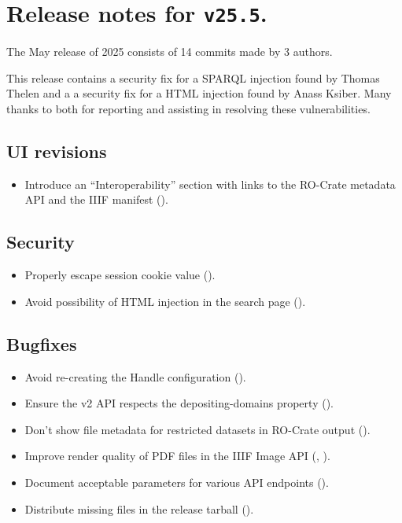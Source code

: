 \section*{Release notes for \texttt{v25.5}.}

  The May release of 2025 consists of 14 commits made by 3 authors.

  This release contains a security fix for a SPARQL injection found by Thomas
  Thelen and a a security fix for a HTML injection found by Anass Ksiber.  Many
  thanks to both for reporting and assisting in resolving these vulnerabilities.

\subsection*{UI revisions}
\begin{itemize}
\item{Introduce an ``Interoperability'' section with links to the RO-Crate
    metadata API and the IIIF manifest
    ().}
\end{itemize}

\subsection*{Security}
\begin{itemize}
\item{Properly escape session cookie value
    ().}
\item{Avoid possibility of HTML injection in the search page
    ().}
\end{itemize}

\subsection*{Bugfixes}
\begin{itemize}
\item{Avoid re-creating the Handle configuration
    ().}
\item{Ensure the v2 API respects the depositing-domains property
    ().}
\item{Don't show file metadata for restricted datasets in RO-Crate
    output ().}
\item{Improve render quality of PDF files in the IIIF Image API
    (,
    ).}
\item{Document acceptable parameters for various API endpoints
    ().}
\item{Distribute missing files in the release tarball
    ().}
\end{itemize}

